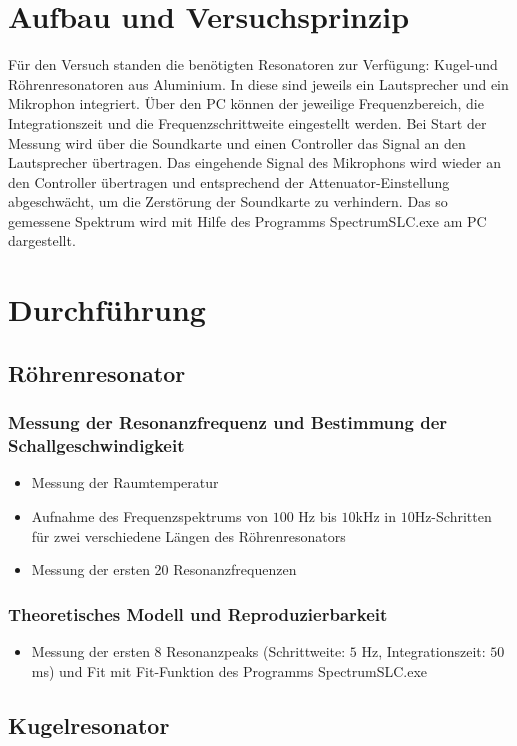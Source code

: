 \documentclass[german,  %
parskip=full,  %
]{scrartcl}
\begin{document}
\section{Aufbau und Versuchsprinzip}
Für den Versuch standen die benötigten Resonatoren zur Verfügung: Kugel-und Röhrenresonatoren aus Aluminium. In diese sind jeweils ein Lautsprecher und ein Mikrophon integriert. Über den PC können der jeweilige Frequenzbereich, die Integrationszeit und die Frequenzschrittweite eingestellt werden. Bei Start der Messung wird über die Soundkarte und einen Controller das Signal an den Lautsprecher übertragen. Das eingehende Signal des Mikrophons wird wieder an den Controller übertragen und entsprechend der Attenuator-Einstellung abgeschwächt, um die Zerstörung der Soundkarte zu verhindern. Das so gemessene Spektrum wird mit Hilfe des Programms SpectrumSLC.exe am PC dargestellt.


\section{Durchführung}
\subsection{Röhrenresonator}
\subsubsection{Messung der Resonanzfrequenz und Bestimmung der Schallgeschwindigkeit}
\begin{itemize}
\item Messung der Raumtemperatur
\item Aufnahme des Frequenzspektrums von $100$ Hz bis $10$kHz in $10$Hz-Schritten für zwei verschiedene Längen des Röhrenresonators 
\item Messung der ersten 20 Resonanzfrequenzen
\end{itemize}
\subsubsection{Theoretisches Modell und Reproduzierbarkeit}
\begin{itemize}
\item Messung der ersten 8 Resonanzpeaks (Schrittweite: $5$ Hz, Integrationszeit: $50$ms) und Fit mit Fit-Funktion des Programms SpectrumSLC.exe
\end{itemize}
\subsection{Kugelresonator}
\end{document}
